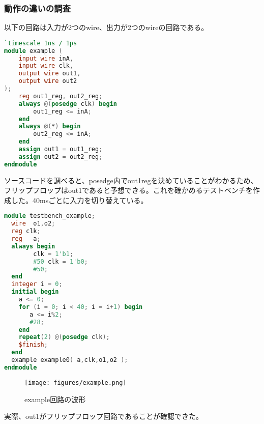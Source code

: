 \documentclass[titlepage]{ltjsarticle}
\begin{document}
\subsubsection{動作の違いの調査}
以下の回路は入力が2つのwire、出力が2つのwireの回路である。
\begin{lstlisting}[caption=*****,language=verilog]
`timescale 1ns / 1ps
module example (
    input wire inA,
    input wire clk,
    output wire out1,
    output wire out2
);
    reg out1_reg, out2_reg;
    always @(posedge clk) begin
        out1_reg <= inA;
    end
    always @(*) begin
        out2_reg <= inA;
    end
    assign out1 = out1_reg;
    assign out2 = out2_reg;
endmodule
\end{lstlisting}
ソースコードを調べると、posedge内でout1regを決めていることがわかるため、フリップフロップはout1であると予想できる。これを確かめるテストベンチを作成した。40msごとに入力を切り替えている。
\begin{lstlisting}[caption=*****,language=verilog]
module testbench_example;
  wire	o1,o2;
  reg clk;
  reg	a;
  always begin
        clk = 1'b1;
        #50 clk = 1'b0;
        #50;
  end
  integer i = 0;
  initial begin
	a <= 0;
	for (i = 0; i < 40; i = i+1) begin
	   a <= i%2;
	   #28;
	end
	repeat(2) @(posedge clk);
	$finish;
  end
  example example0( a,clk,o1,o2 );
endmodule
\end{lstlisting}
\begin{figure}[H]
    \begin{center}
        \texttt{[image: figures/example.png]}
        \caption{example回路の波形}
    \end{center}
\end{figure}
実際、out1がフリップフロップ回路であることが確認できた。
\end{document}
